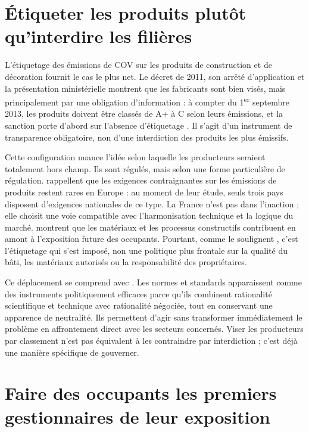 \documentclass[a4paper,12pt,twoside]{book}
\begin{document}
\section{Étiqueter les produits plutôt qu'interdire les filières}

L'étiquetage des émissions de COV sur les produits de construction et de décoration fournit le cas le plus net. Le décret de 2011, son arrêté d'application et la présentation ministérielle montrent que les fabricants sont bien visés, mais principalement par une obligation d'information : à compter du 1\textsuperscript{er} septembre 2013, les produits doivent être classés de A+ à C selon leurs émissions, et la sanction porte d'abord sur l'absence d'étiquetage \parencite{Decret2011COV,Arrete2011COV,MinistereEcologieEtiquetageCOV2025}. Il s'agit d'un instrument de transparence obligatoire, non d'une interdiction des produits les plus émissifs.

Cette configuration nuance l'idée selon laquelle les producteurs seraient totalement hors champ. Ils sont régulés, mais selon une forme particulière de régulation. \textcite{Scutaru2020RiskMitigation} rappellent que les exigences contraignantes sur les émissions de produits restent rares en Europe : au moment de leur étude, seuls trois pays disposent d'exigences nationales de ce type. La France n'est pas dans l'inaction ; elle choisit une voie compatible avec l'harmonisation technique et la logique du marché. \textcite{Gallon2020EmissionsConstructionProcess} montrent que les matériaux et les processus constructifs contribuent en amont à l'exposition future des occupants. Pourtant, comme le soulignent \textcite{HourcadeLeBourhis2024PolitiqueEtiquette}, c'est l'étiquetage qui s'est imposé, non une politique plus frontale sur la qualité du bâti, les matériaux autorisés ou la responsabilité des propriétaires.

Ce déplacement se comprend avec \textcite{borrazChapitre3Normes2005}. Les normes et standards apparaissent comme des instruments politiquement efficaces parce qu'ils combinent rationalité scientifique et technique avec rationalité négociée, tout en conservant une apparence de neutralité. Ils permettent d'agir sans transformer immédiatement le problème en affrontement direct avec les secteurs concernés. Viser les producteurs par classement n'est pas équivalent à les contraindre par interdiction ; c'est déjà une manière spécifique de gouverner.

\section[Les occupants comme premiers gestionnaires de leur exposition]{Faire des occupants les premiers gestionnaires de leur exposition}
\end{document}
